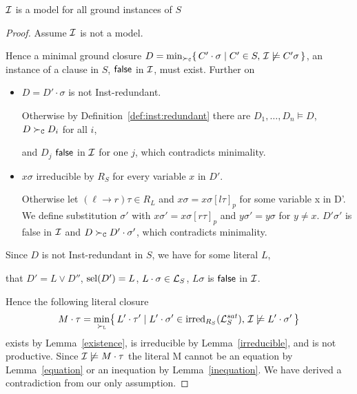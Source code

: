        \begin{lemma}\label{lemma:model:is:candidate}
           \( \mathcal{I} \) is a model for all ground instances of \( S \)
       \end{lemma}

       \begin{proof}
            Assume \( \mathcal{I} \) is not a model.

            Hence a minimal ground closure \(
                D = \min_{\mathrel\succ_{\mathtt{C}}} \{ \,
                C'\cdot\sigma \mid C'\in S, \,
               \mathcal{I}\not\models C'\sigma \,
               \} \),
                an instance of a clause in \( S \),
               \( \mathsf{false} \) in \( \mathcal{I} \), must exist. Further on

       \begin{itemize}
           \item \( D = D'\cdot\sigma \) is not Inst-redundant.
           \vspace{0.2em}

            Otherwise by Definition~\ref{def:inst:redundant} there are
           \( D_1,\ldots,D_n\models D \), \( D\mathrel\succ_{\mathtt{C}} D_i \) for all \( i \),

            and \( D_j \) \( \mathsf{false} \) in \( \mathcal{I} \) for one \( j \), which contradicts minimality.
           \hfill

           \item \( x\sigma \) irreducible by \( R_S \) for every variable \( x \) in \( D' \).
           \vspace{0.2em}

            Otherwise let \( (\ell\to r)\tau\in R_L \) and \( x\sigma = x\sigma{[l\tau]}_p \) for some variable x in D'.
            We define substitution \( \sigma' \) with \( x\sigma' = x\sigma{[r\tau]}_p \) and \( y\sigma' = y\sigma \) for \( y\neq x \).
           \( D'\sigma' \) is false in \( \mathcal{I} \) and \( D\mathrel\succ_{\mathtt{C}} D'\cdot\sigma' \),
            which contradicts minimality.\hfill
       \end{itemize}

        Since \( D \) is not Inst-redundant in \( S \),
        we have for some literal \( L \),

        that \( D' = L\lor D'' \), \( \operatorname{sel}(D') = L \), \( L\cdot\sigma\in\mathcal{L}_S \),
       \( L\sigma \) is \( \mathsf{false} \) in \( \mathcal{I} \).
       \vspace{0.7em}

        Hence the following literal closure
       \begin{gather*}
            M\cdot\tau = \min_{\mathrel\succ_{\mathtt{L}}}\!
   \left \{ \,
        L'\cdot\tau' \mid
        L'\cdot\sigma' \in \operatorname{irred}_{R_S}(\mathcal{L}_S^{sat}), \,
       \mathcal{I}\not\models L'\cdot\sigma' \,
   \right \}
       \end{gather*}
        exists by Lemma~\ref{existence}, is irreducible by Lemma~\ref{irreducible},
        and is not productive.
        Since \( \mathcal{I}\not\models M\cdot\tau \) the literal
        M cannot be an equation by Lemma~\ref{equation}
        or an inequation by Lemma~\ref{inequation}.
        We have derived a contradiction from our only assumption.


\end{proof}
